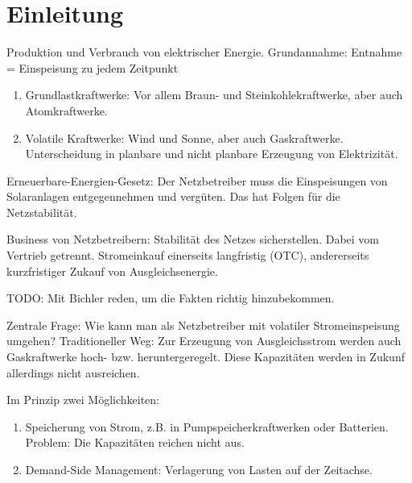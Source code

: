
\section{Einleitung}\label{sec:einleitung}
Produktion und Verbrauch von elektrischer Energie. Grundannahme:
Entnahme = Einspeisung zu jedem Zeitpunkt

\begin{enumerate}
  \item Grundlastkraftwerke: Vor allem Braun- und Steinkohlekraftwerke,
	aber auch Atomkraftwerke.
  \item Volatile Kraftwerke: Wind und Sonne, aber auch Gaskraftwerke.
	Unterscheidung in planbare und nicht planbare Erzeugung von
	Elektrizität.
\end{enumerate}

Erneuerbare-Energien-Gesetz: Der Netzbetreiber muss die Einspeisungen
von Solaranlagen entgegennehmen und vergüten. Das hat Folgen für
die Netzstabilität.

Business von Netzbetreibern: Stabilität des Netzes sicherstellen. Dabei
vom Vertrieb getrennt. Stromeinkauf einerseits langfristig (OTC),
andererseits kurzfristiger Zukauf von Ausgleichsenergie.

TODO: Mit Bichler reden, um die Fakten richtig hinzubekommen.

Zentrale Frage: Wie kann man als Netzbetreiber mit volatiler Stromeinspeisung umgehen?
Traditioneller Weg: Zur Erzeugung von Ausgleichsstrom werden auch
Gaskraftwerke hoch- bzw. heruntergeregelt. Diese Kapazitäten werden in
Zukunf allerdings nicht ausreichen.

Im Prinzip zwei Möglichkeiten:
\begin{enumerate}
  \item Speicherung von Strom, z.B. in Pumpspeicherkraftwerken oder
	Batterien. Problem: Die Kapazitäten reichen nicht aus. 
  \item Demand-Side Management: Verlagerung von Lasten auf der
	Zeitachse.
\end{enumerate}

